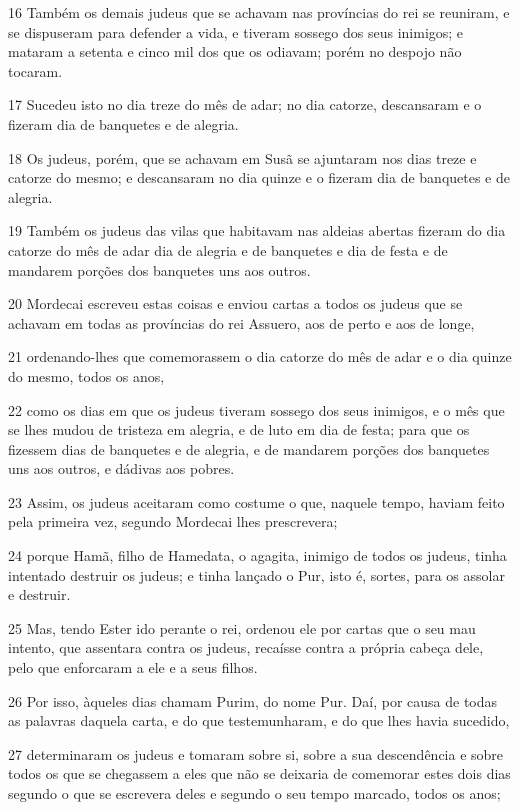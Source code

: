 \par 16 Também os demais judeus que se achavam nas províncias do rei se reuniram, e se dispuseram para defender a vida, e tiveram sossego dos seus inimigos; e mataram a setenta e cinco mil dos que os odiavam; porém no despojo não tocaram.
\par 17 Sucedeu isto no dia treze do mês de adar; no dia catorze, descansaram e o fizeram dia de banquetes e de alegria.
\par 18 Os judeus, porém, que se achavam em Susã se ajuntaram nos dias treze e catorze do mesmo; e descansaram no dia quinze e o fizeram dia de banquetes e de alegria.
\par 19 Também os judeus das vilas que habitavam nas aldeias abertas fizeram do dia catorze do mês de adar dia de alegria e de banquetes e dia de festa e de mandarem porções dos banquetes uns aos outros.
\par 20 Mordecai escreveu estas coisas e enviou cartas a todos os judeus que se achavam em todas as províncias do rei Assuero, aos de perto e aos de longe,
\par 21 ordenando-lhes que comemorassem o dia catorze do mês de adar e o dia quinze do mesmo, todos os anos,
\par 22 como os dias em que os judeus tiveram sossego dos seus inimigos, e o mês que se lhes mudou de tristeza em alegria, e de luto em dia de festa; para que os fizessem dias de banquetes e de alegria, e de mandarem porções dos banquetes uns aos outros, e dádivas aos pobres.
\par 23 Assim, os judeus aceitaram como costume o que, naquele tempo, haviam feito pela primeira vez, segundo Mordecai lhes prescrevera;
\par 24 porque Hamã, filho de Hamedata, o agagita, inimigo de todos os judeus, tinha intentado destruir os judeus; e tinha lançado o Pur, isto é, sortes, para os assolar e destruir.
\par 25 Mas, tendo Ester ido perante o rei, ordenou ele por cartas que o seu mau intento, que assentara contra os judeus, recaísse contra a própria cabeça dele, pelo que enforcaram a ele e a seus filhos.
\par 26 Por isso, àqueles dias chamam Purim, do nome Pur. Daí, por causa de todas as palavras daquela carta, e do que testemunharam, e do que lhes havia sucedido,
\par 27 determinaram os judeus e tomaram sobre si, sobre a sua descendência e sobre todos os que se chegassem a eles que não se deixaria de comemorar estes dois dias segundo o que se escrevera deles e segundo o seu tempo marcado, todos os anos;

